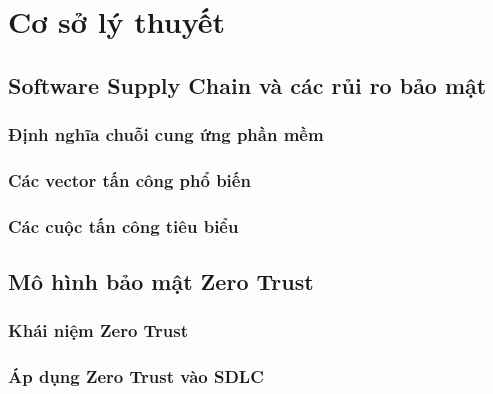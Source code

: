 \chapter{Cơ sở lý thuyết}\label{ch:background}

\section{Software Supply Chain và các rủi ro bảo mật}

\subsection{Định nghĩa chuỗi cung ứng phần mềm}

\subsection{Các vector tấn công phổ biến}

\subsection{Các cuộc tấn công tiêu biểu}

\section{Mô hình bảo mật Zero Trust}

\subsection{Khái niệm Zero Trust}

\subsection{Áp dụng Zero Trust vào SDLC}

